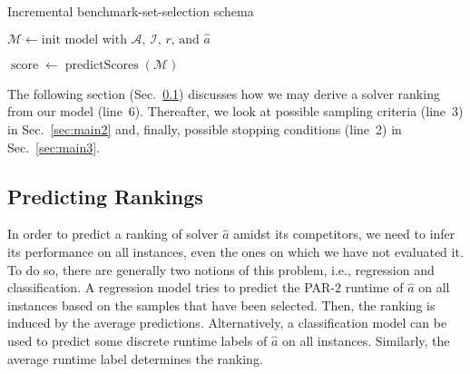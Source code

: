 \documentclass[runningheads]{llncs}
\begin{document}
\begin{algorithm}
  \caption{Incremental benchmark-set-selection schema}
  \label{algALBenchmark}


  $\mathcal{M} \leftarrow \textrm{init model with $\mathcal{A}$, $\mathcal{I}$, $r$, and $\hat{a}$}$


  $\operatorname{score} \leftarrow \operatorname{predictScores}\!\left(\mathcal{M}\right)$

\end{algorithm}

The following section (Sec.~\ref{sec:main1}) discusses how we may derive a solver ranking from our model (line~6).
Thereafter, we look at possible sampling criteria (line~3) in Sec.~\ref{sec:main2} and, finally, possible stopping conditions (line~2) in Sec.~\ref{sec:main3}.

\subsection{Predicting Rankings}
\label{sec:main1}
In order to predict a ranking of solver $\hat{a}$ amidst its competitors, we need to infer its performance on all instances, even the ones on which we have not evaluated it.
To do so, there are generally two notions of this problem, i.e., regression and classification.
A regression model tries to predict the \mbox{PAR-2} runtime of $\hat{a}$ on all instances based on the samples that have been selected.
Then, the ranking is induced by the average predictions.
Alternatively, a classification model can be used to predict some discrete runtime labels of $\hat{a}$ on all instances.
Similarly, the average runtime label determines the ranking.
\end{document}
